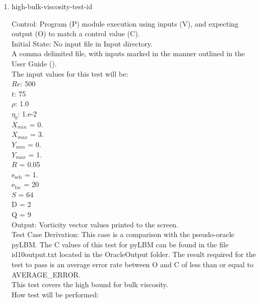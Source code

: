 \documentclass[12pt, titlepage]{article}
\newcounter{testcounter} %
\begin{document}
\begin{enumerate}
\item{high-bulk-viscosity-test-id\thetestcounter \\}

Control: Program (P) module execution using inputs (V), and expecting output (O) to match a control value (C).\\
					
Initial State: No input file in Input directory.\\
					
A comma delimited file, with inputs marked in the manner outlined in the User Guide (\citet{LBM_UserGuide_PM}).\\The input values for this test will be:\\
$Re$: 500\\
$t$: 75\\
$\rho$: 1.0\\
$\eta_b$: 1.e-2\\
$X_{min}$ = 0.\\
$X_{max}$ = 3.\\
$Y_{min}$ = 0.\\
$Y_{max}$ = 1.\\
$R$ = 0.05\\
$\mathrm{e_{sch}}$ = 1.\\
$\mathrm{e_{fac}}$ = 20\\
$S$ = 64\\
$\mathrm{D}$ = 2\\
$\mathrm{Q}$ = 9\\

Output: Vorticity vector values printed to the screen. \\ 

Test Case Derivation: This case is a comparison with the pseudo-oracle pyLBM. The C values of this test for pyLBM can be found in the file id10output.txt located in the OracleOutput folder. The result required for the test to pass is an average error rate between O and C of less than or equal to AVERAGE\_ERROR.\\
This test covers the high bound for bulk viscosity.\\

					
How test will be performed: 


\end{enumerate}
\end{document}
